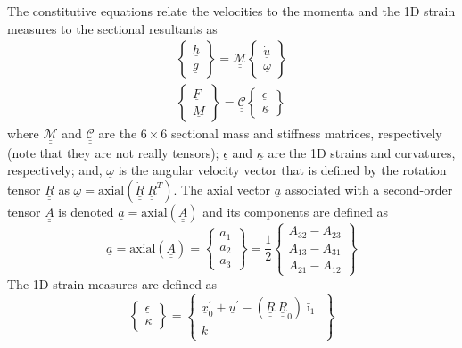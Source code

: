 \documentclass{aiaa-tc}
\newcommand{\tens}[1]{\underline{\underline{#1}}}
\renewcommand{\vec}[1]{\underline{#1}}
\begin{document}
The constitutive equations relate the velocities to the momenta and the 1D strain measures to the sectional resultants as
\begin{align}
	\label{ConstitutiveMass}
	\begin{Bmatrix}
	\underline{h} \\
	\underline{g}
	\end{Bmatrix}
	= \underline{\underline{\mathcal{M}}} \begin{Bmatrix}
	\dot{\underline{u}} \\
	\underline{\omega}
	\end{Bmatrix} \\
	\label{ConstitutiveStiff}
	\begin{Bmatrix}
	\underline{F} \\
	\underline{M}
	\end{Bmatrix}
	= \underline{\underline{\mathcal{C}}} \begin{Bmatrix}
	\underline{\epsilon} \\
	\underline{\kappa}
	\end{Bmatrix}
\end{align}
where $\underline{\underline{\mathcal{M}}}$ and
$\underline{\underline{\mathcal{C}}}$ are the $6 \times 6$ sectional mass
and stiffness matrices, respectively (note that they are not really tensors);
$\underline{\epsilon}$ and $\underline{\kappa}$ are the 1D strains and
curvatures, respectively; and, $\underline{\omega}$ is the angular velocity
vector that is defined by the rotation tensor $\underline{\underline{R}}$ as
$\underline{\omega} =
\mathrm{axial}(\dot{\underline{\underline{R}}}~\underline{\underline{R}}^T)$. The axial vector $\vec{a}$ associated with a second-order tensor $\tens{A}$ is denoted $\vec{a}=\mathrm{axial}(\tens{A})$ and its components are defined as
\begin{equation}
    \label{axial}
    \vec{a} = \mathrm{axial}(\tens{A})=\begin{Bmatrix}
    a_1 \\
    a_2 \\
    a_3
    \end{Bmatrix}
    =\frac{1}{2}
    \begin{Bmatrix}
    A_{32}-A_{23} \\
    A_{13}-A_{31} \\
    A_{21}-A_{12}
    \end{Bmatrix}
\end{equation}
The 1D strain measures are defined as
\begin{equation}
    \label{1DStrain}
    \begin{Bmatrix}
        \vec{\epsilon} \\
        \vec{\kappa}
    \end{Bmatrix}
    =
    \begin{Bmatrix}
        \vec{x}^\prime_0 + \vec{u}^\prime - (\tens{R} ~\tens{R}_0) \bar{\imath}_1 \\
        \vec{k}
    \end{Bmatrix}
\end{equation}
\end{document}
